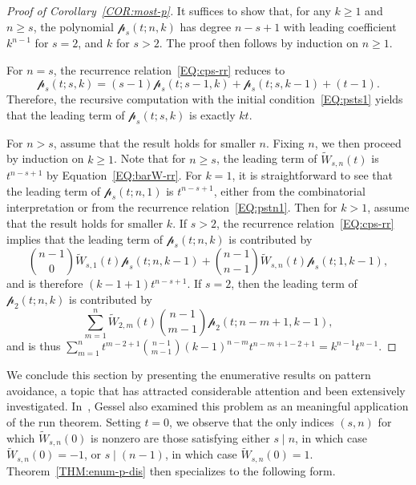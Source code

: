 \documentclass[11pt]{article}
\numberwithin{equation}{section}
\newtheorem{cor}[thm]{Corollary}
\def\oQ{\overline{Q}}
\newcommand{\cp}{\mathcal{p}}
\begin{document}
\begin{proof}[Proof of Corollary~\ref{COR:most-p}]
	It suffices to show that, for any $k\geq1$ and $n\geq s$, the polynomial $\cp_s(t;n,k)$ has degree $n-s+1$ with leading coefficient $k^{n-1}$ for $s=2$, and $k$ for $s>2$. The proof then follows by induction on $n\geq1$.
	
	For $n=s$, the recurrence relation~\eqref{EQ:cps-rr} reduces to
	\[\cp_s(t;s,k)=(s-1)\cp_s(t;s-1,k)+\cp_s(t;s,k-1)+(t-1).\]
	Therefore, the recursive computation with the initial condition~\eqref{EQ:psts1} yields that the leading term of $\cp_s(t;s,k)$ is exactly $kt$.
	
	For $n>s$, assume that the result holds for smaller $n$. Fixing $n$, we then proceed by induction on $k\geq1$. Note that for $n\geq s$, the leading term of $\tilde{W}_{s,n}(t)$ is $t^{n-s+1}$ by Equation~\eqref{EQ:barW-rr}. For $k=1$, it is straightforward to see that the leading term of $\cp_s(t;n,1)$ is $t^{n-s+1}$, either from the combinatorial interpretation or from the recurrence relation~\eqref{EQ:pstn1}. Then for $k>1$, assume that the result holds for smaller $k$. If $s>2$, the recurrence relation~\eqref{EQ:cps-rr} implies that the leading term of $\cp_s(t;n,k)$ is contributed by 
	\[\binom{n-1}{0}\tilde{W}_{s,1}(t)\cp_s(t;n,k-1)+\binom{n-1}{n-1}\tilde{W}_{s,n}(t)\cp_s(t;1,k-1),\]
	and is therefore $(k-1+1)t^{n-s+1}$. If $s=2$, then the leading term of $\cp_2(t;n,k)$ is contributed by
	\[\sum_{m=1}^{n}\tilde{W}_{2,m}(t)\binom{n-1}{m-1}\cp_2(t;n-m+1,k-1),\]
	and is thus
	$\sum_{m=1}^{n}t^{m-2+1}\binom{n-1}{m-1}(k-1)^{n-m}t^{n-m+1-2+1}
	=k^{n-1}t^{n-1}$.
\end{proof}

We conclude this section by presenting the enumerative results on pattern avoidance, a topic that has attracted considerable attention and been extensively investigated. In~\cite[Example 3, p.~51]{Gessel1977}, Gessel also examined this problem as an meaningful application of the run theorem. Setting $t=0$, we observe that the only indices $(s,n)$ for which $\tilde{W}_{s,n}(0)$ is nonzero are those satisfying either $s \mid n$, in which case $\tilde{W}_{s,n}(0) = -1$, or $s \mid (n-1)$, in which case $\tilde{W}_{s,n}(0) = 1$. Theorem~\ref{THM:enum-p-dis} then specializes to the following form.
\end{document}
